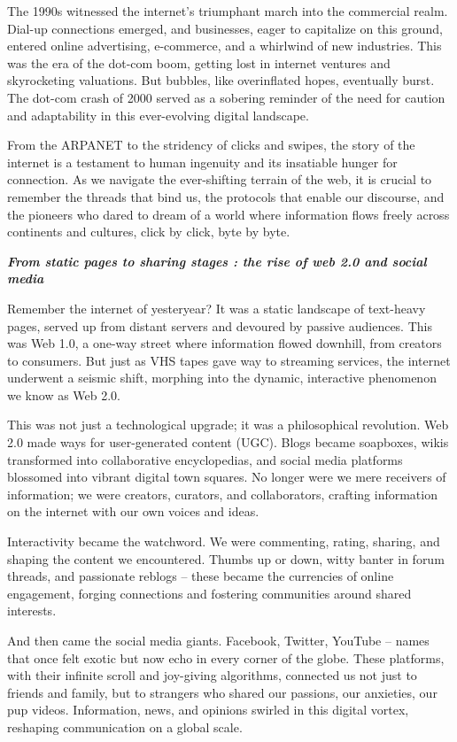 \documentclass[
  letterpaper,
  DIV=11,
  numbers=noendperiod]{scrreprt}
\begin{document}
The 1990s witnessed the internet's triumphant march into the commercial
realm. Dial-up connections emerged, and businesses, eager to capitalize
on this ground, entered online advertising, e-commerce, and a whirlwind
of new industries. This was the era of the dot-com boom, getting lost in
internet ventures and skyrocketing valuations. But bubbles, like
overinflated hopes, eventually burst. The dot-com crash of 2000 served
as a sobering reminder of the need for caution and adaptability in this
ever-evolving digital landscape.

From the ARPANET to the stridency of clicks and swipes, the story of the
internet is a testament to human ingenuity and its insatiable hunger for
connection. As we navigate the ever-shifting terrain of the web, it is
crucial to remember the threads that bind us, the protocols that enable
our discourse, and the pioneers who dared to dream of a world where
information flows freely across continents and cultures, click by click,
byte by byte.

\textbf{\emph{From static pages to sharing stages : the rise of web 2.0
and social media}}

Remember the internet of yesteryear? It was a static landscape of
text-heavy pages, served up from distant servers and devoured by passive
audiences. This was Web 1.0, a one-way street where information flowed
downhill, from creators to consumers. But just as VHS tapes gave way to
streaming services, the internet underwent a seismic shift, morphing
into the dynamic, interactive phenomenon we know as Web 2.0.

This was not just a technological upgrade; it was a philosophical
revolution. Web 2.0 made ways for user-generated content (UGC). Blogs
became soapboxes, wikis transformed into collaborative encyclopedias,
and social media platforms blossomed into vibrant digital town squares.
No longer were we mere receivers of information; we were creators,
curators, and collaborators, crafting information on the internet with
our own voices and ideas.

Interactivity became the watchword. We were commenting, rating, sharing,
and shaping the content we encountered. Thumbs up or down, witty banter
in forum threads, and passionate reblogs -- these became the currencies
of online engagement, forging connections and fostering communities
around shared interests.

And then came the social media giants. Facebook, Twitter, YouTube --
names that once felt exotic but now echo in every corner of the globe.
These platforms, with their infinite scroll and joy-giving algorithms,
connected us not just to friends and family, but to strangers who shared
our passions, our anxieties, our pup videos. Information, news, and
opinions swirled in this digital vortex, reshaping communication on a
global scale.
\end{document}

